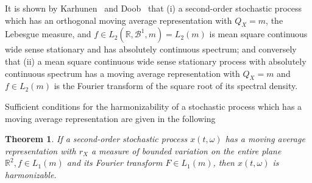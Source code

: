 \documentclass{article}
\newtheorem{theorem}{Theorem}
\begin{document}
It is shown by Karhunen~{\cite{karhunen1947}} and Doob~{\cite{doob1953}} that
(i) a second-order stochastic process which has an orthogonal moving average
representation with $Q_X = m$, the Lebesgue measure, and $f \in L_2
(\mathbb{R}, \mathscr{B}^1, m) = L_2 (m)$ is mean square continuous wide sense
stationary and has absolutely continuous spectrum; and conversely that (ii) a
mean square continuous wide sense stationary process with absolutely
continuous spectrum has a moving average representation with $Q_X = m$ and $f
\in L_2 (m)$ is the Fourier transform of the square root of its spectral
density.

Sufficient conditions for the harmonizability of a stochastic process which
has a moving average representation are given in the following

\begin{theorem}
  \label{thm:moving-avg-harmonizable}If a second-order stochastic process $x
  (t, \omega)$ has a moving average representation with $r_X$ a measure of
  bounded variation on the entire plane $\mathbb{R}^2, f \in L_1 (m)$ and its
  Fourier transform $F \in L_1 (m)$, then $x (t, \omega)$ is harmonizable.
\end{theorem}
\end{document}
